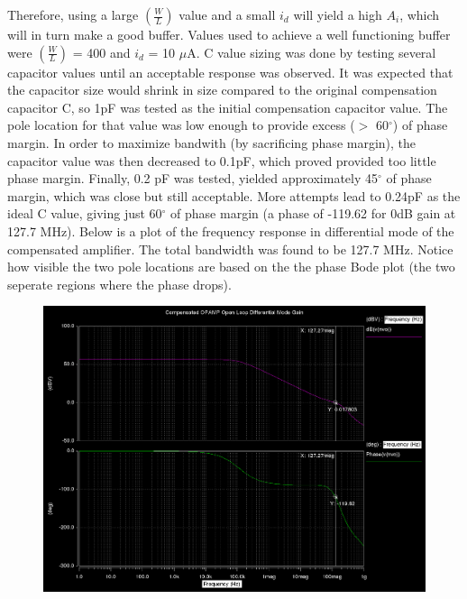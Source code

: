 \documentclass[12pt]{article}
\begin{document}
Therefore, using a large $\left(\frac{W}{L}\right)$ value and a small $i_d$ will yield a high $A_i$, which will in turn make a good buffer. Values used to achieve a well functioning buffer were $\left(\frac{W}{L}\right)$ = 400 and $i_d$ = 10 $\mu$A. C value sizing was done by testing several capacitor values until an acceptable response was observed. It was expected that the capacitor size would shrink in size compared to the original compensation capacitor C, so 1pF was tested as the initial compensation capacitor value. The pole location for that value was low enough to provide excess ($>$ 60$ ^\circ$) of phase margin. In order to maximize bandwith (by sacrificing phase margin), the capacitor value was then decreased to 0.1pF, which proved provided too little phase margin. Finally, 0.2 pF was tested, yielded approximately 45$ ^\circ$ of phase margin, which was close but still acceptable. More attempts lead to 0.24pF as the ideal C value, giving just 60$ ^\circ$ of phase margin (a phase of -119.62 for 0dB gain at 127.7 MHz). Below is a plot of the frequency response in differential mode of the compensated amplifier. The total bandwidth was found to be 127.7 MHz. Notice how visible the two pole locations are based on the the phase Bode plot (the two seperate regions where the phase drops).
\FloatBarrier
\begin{figure}[h!]
\begin{center}
 \includegraphics[scale=0.27]{./compensated.png}
\end{center}
\end{figure}
\FloatBarrier
\end{document}
